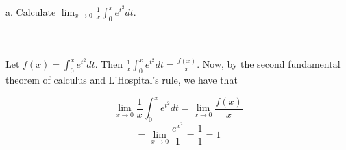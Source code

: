 a. Calculate $\lim_{x\rightarrow0}\frac1x\int_0^xe^{t^2}dt$.\\\\

\begin{solution}\renewcommand{\qedsymbol}{}\ \\
    Let $f(x)=\int_0^xe^{t^2}dt$. Then $\frac1x\int_0^xe^{t^2}dt=\frac{f(x)}{x}$. Now, by the second
    fundamental theorem of calculus and L'Hospital's rule, we have that
    
    $$\lim_{x\to0}\frac1x\int_0^xe^{t^2}dt=\lim_{x\to0}\frac{f(x)}{x}$$
    $$=\lim_{x\to0}\frac{e^{x^2}}{1}=\frac11=1$$

\end{solution}